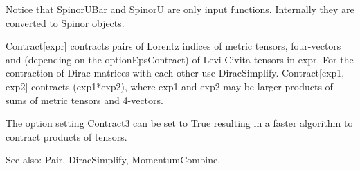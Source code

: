
Notice that SpinorUBar and SpinorU are only input functions. Internally they are converted to Spinor objects.



Contract[expr] contracts pairs of Lorentz indices of metric tensors, four-vectors and (depending on the optionEpsContract) of Levi-Civita
  tensors in expr. For the contraction of Dirac matrices with each other use DiracSimplify. Contract[exp1, exp2] contracts (exp1*exp2),
  where exp1 and exp2 may be larger products of sums of metric tensors and 4-vectors.



The option setting Contract3 can be set to True resulting in a faster algorithm to contract products of tensors.

See also:  Pair, DiracSimplify, MomentumCombine.








